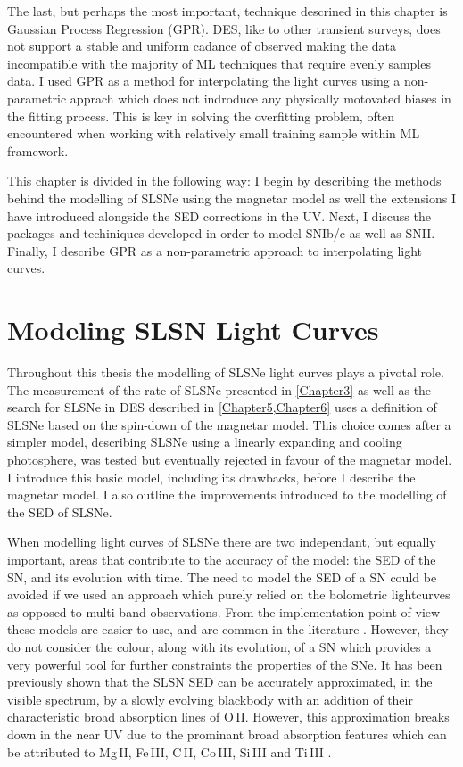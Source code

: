 The last, but perhaps the most important, technique descrined in this chapter is Gaussian Process Regression (GPR). DES, like to other transient surveys, does not support a stable and uniform cadance of observed making the data incompatible with the majority of ML techniques that require evenly samples data. I used GPR as a method for interpolating the light curves using a non-parametric apprach which does not indroduce any physically motovated biases in the fitting process. This is key in solving the overfitting problem, often encountered when working with relatively small training sample within ML framework.

This chapter is divided in the following way: I begin by describing the methods behind the modelling of SLSNe using the magnetar model as well the extensions I have introduced alongside the SED corrections in the UV. Next, I discuss the packages and techiniques developed in order to model SNIb/c as well as SNII. Finally, I describe GPR as a non-parametric approach to interpolating light curves.

\section{Modeling SLSN Light Curves} \label{sec:SLAP}
Throughout this thesis the modelling of SLSNe light curves plays a pivotal role. The measurement of the rate of SLSNe presented in \cref{Chapter3} as well as the search for SLSNe in DES described in \cref{Chapter5,Chapter6} uses a definition of SLSNe based on the spin-down of the magnetar model. This choice comes after a simpler model, describing SLSNe using a linearly expanding and cooling photosphere, was tested but eventually rejected in favour of the magnetar model. I introduce this basic model, including its drawbacks, before I describe the magnetar model. I also outline the improvements introduced to the modelling of the SED of SLSNe.

When modelling light curves of SLSNe there are two independant, but equally important, areas that contribute to the accuracy of the model: the SED of the SN, and its evolution with time. The need to model the SED of a SN could be avoided if we used an approach which purely relied on the bolometric lightcurves as opposed to multi-band observations. From the implementation point-of-view these models are easier to use, and are common in the literature \citep{Inserra2013,Papadopuplus2014,Nicholl2014}. However, they do not consider the colour, along with its evolution, of a SN which provides a very powerful tool for further constraints the properties of the SNe. It has been previously shown \citep{Chomniuk2011,Howell2013,Papadopuplus2014,Vreeswijk2014} that the SLSN SED can be accurately approximated, in the visible spectrum, by a slowly evolving blackbody with an addition of their characteristic broad absorption lines of O\,II. However, this approximation breaks down in the near UV due to the prominant broad absorption features which can be attributed to Mg\,II, Fe\,III, C\,II, Co\,III, Si\,III and Ti\,III \citep[see][for line identifications]{Mazalli2016}.

